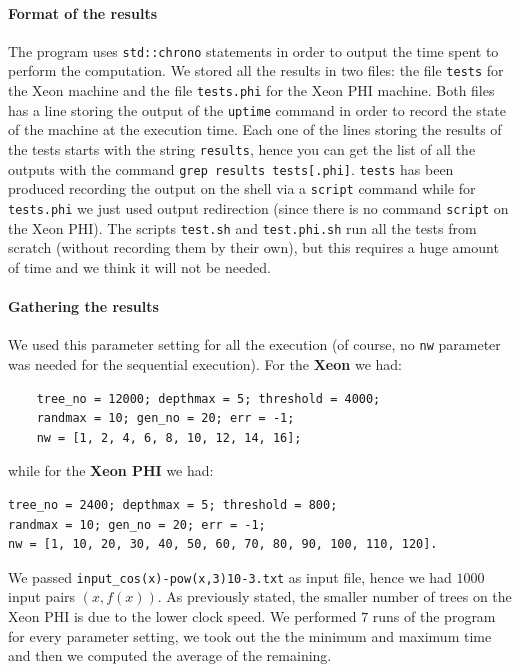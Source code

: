 \documentclass[10pt]{article}
\numberwithin{equation}{section}
\begin{document}
\paragraph{Format of the results}
The program uses \verb|std::chrono| statements in order to output the time spent to perform the computation. We stored all the results in two files: the file \verb|tests| for the Xeon machine and the file \verb|tests.phi| for the Xeon PHI machine. Both files has a line storing the output of the \verb|uptime| command in order to record the state of the machine at the execution time. Each one of the lines storing the results of the tests starts with the string \verb|results|, hence you can get the list of all the outputs with the command \verb|grep results tests[.phi]|. \verb|tests| has been produced recording the output on the shell via a \verb|script| command while for \verb|tests.phi| we just used output redirection (since there is no command \verb|script| on the Xeon PHI). The scripts \verb|test.sh| and \verb|test.phi.sh| run all the tests from scratch (without recording them by their own), but this requires a huge amount of time and we think it will not be needed.
\paragraph{Gathering the results}
We used this parameter setting for all the execution (of course, no \verb|nw| parameter was needed for the sequential execution). For the \textbf{Xeon} we had:
\begin{verbatim}
	tree_no = 12000; depthmax = 5; threshold = 4000;
	randmax = 10; gen_no = 20; err = -1;
	nw = [1, 2, 4, 6, 8, 10, 12, 14, 16];
\end{verbatim}
while for the \textbf{Xeon PHI} we had:
\begin{verbatim}
tree_no = 2400; depthmax = 5; threshold = 800;
randmax = 10; gen_no = 20; err = -1;
nw = [1, 10, 20, 30, 40, 50, 60, 70, 80, 90, 100, 110, 120].
\end{verbatim}
We passed \verb|input_cos(x)-pow(x,3)10-3.txt| as input file, hence we had $1000$ input pairs $(x, f(x))$. As previously stated, the smaller number of trees on the Xeon PHI is due to the lower clock speed. We performed $7$ runs of the program for every parameter setting, we took out the the minimum and maximum time and then we computed the average of the remaining.
\end{document}
